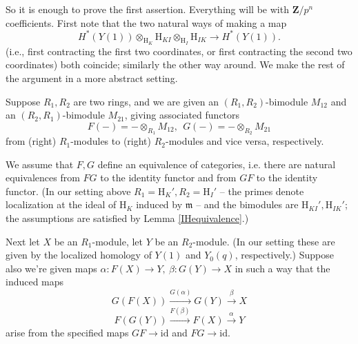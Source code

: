 \documentclass[10pt]{amsart}
\newcommand{\Z}{\mathbf{Z}}
\newcommand{\rhobar}{\overline{\rho}}
\newcommand{\Frob}{\mathrm{Frob}}
\theoremstyle{remark}
\begin{document}
%
%
%
%
%



So it is enough to prove the first assertion. 
Everything will be with  $\Z/p^n$ coefficients.  First  note that  the two natural ways of making a map
$$H^*(Y(1)) \otimes_{\mathrm{H}_K} \mathrm{H}_{KI} \otimes_{\mathrm{H}_I} \mathrm{H}_{IK} \longrightarrow H^*(Y(1)).$$
(i.e., first contracting the first two coordinates, or first contracting the second two coordinates)
both coincide; similarly  the other way around. %
We make the rest of the argument in a more abstract setting. 
 
 
Suppose $R_{1}, R_2$ are two rings, 
and we are given an $(R_1, R_2)$-bimodule $M_{12}$ and an $(R_2,R_1)$-bimodule $M_{21}$,
giving associated functors $$F(-) =  - \otimes_{R_1} M_{12}, \ \ G(-) = - \otimes_{R_2} M_{21}$$ 
from (right) $R_1$-modules to (right) $R_2$-modules and vice versa, respectively.

We assume that $F,G$ define an equivalence of categories, i.e. there are natural equivalences
from $FG$ to the identity functor and from $GF$ to the identity functor. 
(In our setting above $R_1=\mathrm{H}_K', R_2 = \mathrm{H}_I'$ -- the primes denote localization at the ideal of $\mathrm{H}_K$ induced 
by $\mathfrak{m}$ --   
and the bimodules are $\mathrm{H}_{KI}',  \mathrm{H}_{IK}'$; the assumptions are satisfied by  Lemma \ref{IHequivalence}.)
 
  Next let $X$ be an $R_1$-module, let $Y$ be an $R_2$-module. (In our setting these are given by the  localized homology of $Y(1)$ and $Y_0(q)$, respectively.) 
Suppose also we're given 
maps $\alpha: F(X) \rightarrow Y, \ \beta: G(Y) \rightarrow X$ in such a way that the induced maps
\begin{equation} \label{oq}  G(F(X)) \stackrel{G(\alpha)}{ \longrightarrow }G(Y)  \stackrel{\beta}{\longrightarrow}  X \end{equation} 
\begin{equation} \label{oq2}   F(G(Y))  \stackrel{F(\beta)}{\longrightarrow}  F(X)  \stackrel{\alpha}{\longrightarrow }  Y \end{equation} 
arise from the specified maps $GF \rightarrow \mathrm{id}$ and $FG \rightarrow \mathrm{id}$. 
\end{document}

